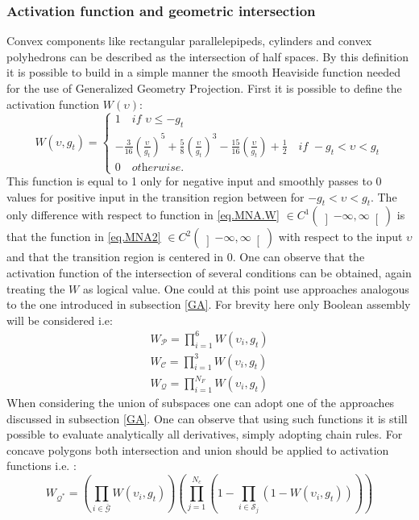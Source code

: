 \subsubsection{Activation function and geometric intersection}
Convex components like rectangular parallelepipeds, cylinders and convex polyhedrons can be described as the intersection of half spaces. By this definition it is possible to build in a simple manner the smooth Heaviside function needed for the use of Generalized Geometry Projection. First it is possible to define the activation function $W(\upsilon)$:
\begin{equation}
\label{eq.MNA2}
W(\upsilon,g_t)=\begin{cases}
1 \quad \textit{if }  \upsilon\leq -g_t\\
-\frac{3}{16}\left(\frac{\upsilon}{g_t}\right)^5
+\frac{5}{8}\left(\frac{\upsilon}{g_t}\right)^3
-\frac{15}{16}\left(\frac{\upsilon}{g_t}\right)+\frac{1}{2}\quad \textit{if } -g_t<\upsilon< g_t\\
0 \quad \textit{otherwise.} 
\end{cases}
\end{equation}
This function is equal to 1 only for negative input and smoothly passes to 0 values for positive input in the transition region between for $-g_t<\upsilon< g_t$.  The only difference with respect to function in \eqref{eq.MNA.W} $\in C^1(\left]-\infty,\infty\right[)$ is that the function in \eqref{eq.MNA2} $\in C^2(\left]-\infty,\infty\right[)$ with respect to the input $\upsilon$ and that the transition region is centered in 0.  One can observe that the activation function of the intersection of several conditions can be obtained, again treating the $W$ as logical value. One could at this point use approaches analogous to the one introduced in subsection \ref{GA}. For brevity here only Boolean assembly will be considered i.e:
\begin{eqnarray}
W_{\mathscr{P}}=\prod_{i=1}^6{W(\upsilon_i,g_t)}\\
W_{\mathscr{C}}=\prod_{i=1}^3{W(\upsilon_i,g_t)}\\
W_{\mathscr{Q}}=\prod_{i=1}^{N_F}{W(\upsilon_i,g_t)}
\end{eqnarray}
When considering the union of subspaces one can adopt one of the approaches discussed in subsection \ref{GA}. One can observe that using such functions it is still possible to evaluate analytically all derivatives, simply adopting chain rules. For concave polygons both intersection and union should be applied to activation functions i.e. :
\begin{equation}
W_{\mathscr{Q}^*}=\left(\prod_{i\in\bar{\mathscr{G}}}{W\left(\upsilon_i,g_t\right)}\right)\left(\prod_{j=1}^{N_c}{\left(1-\prod_{i\in\mathscr{S}_j}{\left(1-W\left(\upsilon_i,g_t\right)\right)}\right)}\right)
\end{equation}
